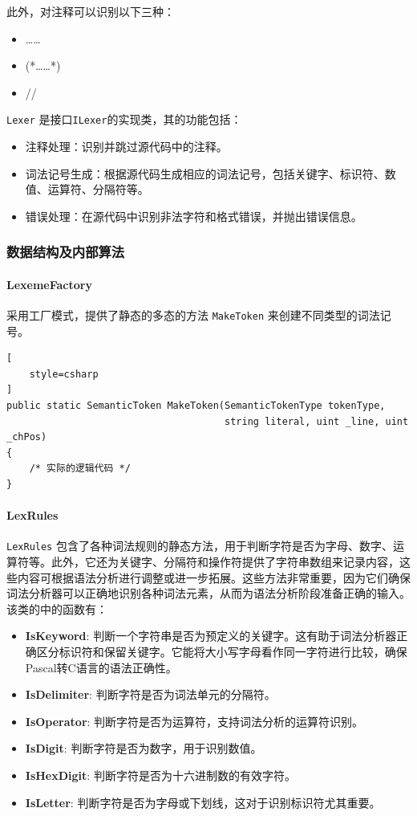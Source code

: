 \documentclass[../main.tex]{subfiles}
\begin{document}
此外，对注释可以识别以下三种：
\begin{itemize}
\item {……}
\item (*……*)
\item //
\end{itemize}

\texttt{Lexer} 是接口\texttt{ILexer}的实现类，其的功能包括：
\begin{itemize}
    \item 注释处理：识别并跳过源代码中的注释。
    \item 词法记号生成：根据源代码生成相应的词法记号，包括关键字、标识符、数值、运算符、分隔符等。
    \item 错误处理：在源代码中识别非法字符和格式错误，并抛出错误信息。
\end{itemize}

\subsubsection{数据结构及内部算法}

\paragraph{LexemeFactory}
采用工厂模式，提供了静态的多态的方法 \texttt{MakeToken} 来创建不同类型的词法记号。

\begin{lstlisting}[
    style=csharp
]
public static SemanticToken MakeToken(SemanticTokenType tokenType, 
                                      string literal, uint _line, uint _chPos)
{
    /* 实际的逻辑代码 */
}
\end{lstlisting}

\paragraph{LexRules}
\texttt{LexRules} 包含了各种词法规则的静态方法，用于判断字符是否为字母、数字、运算符等。此外，它还为关键字、分隔符和操作符提供了字符串数组来记录内容，这些内容可根据语法分析进行调整或进一步拓展。这些方法非常重要，因为它们确保词法分析器可以正确地识别各种词法元素，从而为语法分析阶段准备正确的输入。该类的中的函数有：
\begin{itemize}
    \item \textbf{IsKeyword}: 判断一个字符串是否为预定义的关键字。这有助于词法分析器正确区分标识符和保留关键字。它能将大小写字母看作同一字符进行比较，确保Pascal转C语言的语法正确性。
    \item \textbf{IsDelimiter}: 判断字符是否为词法单元的分隔符。
    \item \textbf{IsOperator}: 判断字符是否为运算符，支持词法分析的运算符识别。
    \item \textbf{IsDigit}: 判断字符是否为数字，用于识别数值。
    \item \textbf{IsHexDigit}: 判断字符是否为十六进制数的有效字符。
    \item \textbf{IsLetter}: 判断字符是否为字母或下划线，这对于识别标识符尤其重要。
\end{itemize}
\end{document}
